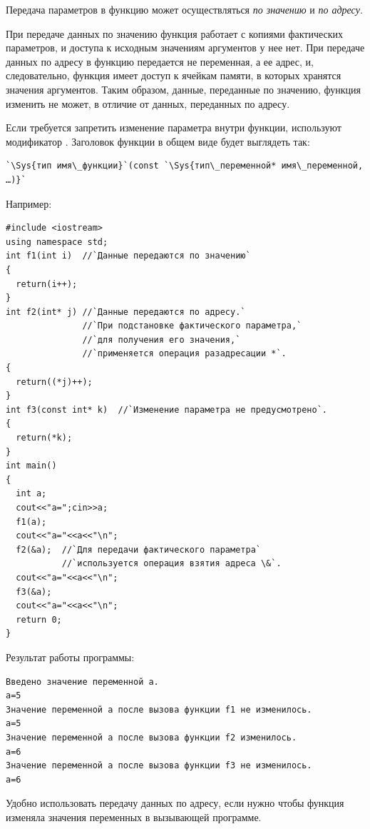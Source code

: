 Передача параметров в функцию может осуществляться \emph{по
значению} и \emph{по адресу}. 

При передаче данных по значению функция работает с копиями фактических параметров, и доступа к исходным значениям
аргументов у нее нет. При передаче данных по адресу в функцию передается не переменная, а ее адрес, и, следовательно,
функция имеет доступ к ячейкам памяти, в которых хранятся значения аргументов. Таким образом, данные, переданные по
значению, функция изменить не может, в отличие от данных, переданных по адресу. 

Если требуется запретить изменение параметра внутри функции, используют модификатор . Заголовок
функции в общем виде будет выглядеть так:
\begin{lstlisting}
`\Sys{тип имя\_функции}`(const `\Sys{тип\_переменной* имя\_переменной, …)}`
\end{lstlisting}

Например:
\begin{lstlisting}
#include <iostream>
using namespace std;
int f1(int i)  //`Данные передаются по значению`
{
  return(i++);
}
int f2(int* j) //`Данные передаются по адресу.`
               //`При подстановке фактического параметра,` 
               //`для получения его значения,` 
               //`применяется операция разадресации *`.
{
  return((*j)++);
}
int f3(const int* k)  //`Изменение параметра не предусмотрено`.
{
  return(*k);
}
int main()
{
  int a;
  cout<<"a=";cin>>a;
  f1(a);
  cout<<"a="<<a<<"\n";
  f2(&a);  //`Для передачи фактического параметра` 
           //`используется операция взятия адреса \&`.
  cout<<"a="<<a<<"\n";
  f3(&a);
  cout<<"a="<<a<<"\n";
  return 0;
}
\end{lstlisting}

Результат работы программы:
\begin{verbatim}
Введено значение переменной a.
a=5 
Значение переменной a после вызова функции f1 не изменилось.
a=5 
Значение переменной a после вызова функции f2 изменилось.
a=6 
Значение переменной a после вызова функции f3 не изменилось.
a=6 
\end{verbatim}

Удобно использовать передачу данных по адресу, если нужно чтобы функция изменяла значения переменных в вызывающей
программе.

